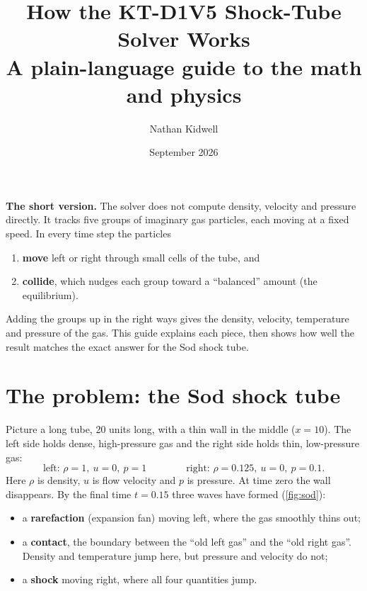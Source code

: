 \documentclass[11pt]{article}
\title{\textbf{How the KT-D1V5 Shock-Tube Solver Works}\\[4pt]
\large A plain-language guide to the math and physics}
\author{Nathan Kidwell}
\date{September 2026}
\begin{document}
\maketitle

\begin{idea}
\textbf{The short version.}
The solver does not compute density, velocity and pressure directly.  It tracks
five groups of imaginary gas particles, each moving at a fixed speed.  In every
time step the particles
\begin{enumerate}[leftmargin=18pt]
  \item \textbf{move} left or right through small cells of the tube, and
  \item \textbf{collide}, which nudges each group toward a ``balanced'' amount
        (the equilibrium).
\end{enumerate}
Adding the groups up in the right ways gives the density, velocity, temperature
and pressure of the gas.  This guide explains each piece, then shows how well the
result matches the exact answer for the Sod shock tube.
\end{idea}

\tableofcontents

\section{The problem: the Sod shock tube}

Picture a long tube, 20 units long, with a thin wall in the middle ($x = 10$).
The left side holds dense, high-pressure gas and the right side holds thin,
low-pressure gas:
\[
\text{left: } \rho = 1,\ u = 0,\ p = 1 \qquad\qquad
\text{right: } \rho = 0.125,\ u = 0,\ p = 0.1 .
\]
Here $\rho$ is density, $u$ is flow velocity and $p$ is pressure.  At time zero the
wall disappears.  By the final time $t = 0.15$ three waves have formed
(\cref{fig:sod}):
\begin{itemize}
  \item a \textbf{rarefaction} (expansion fan) moving left, where the gas smoothly
        thins out;
  \item a \textbf{contact}, the boundary between the ``old left gas'' and the
        ``old right gas''.  Density and temperature jump here, but pressure and
        velocity do not;
  \item a \textbf{shock} moving right, where all four quantities jump.
\end{itemize}
\end{document}
